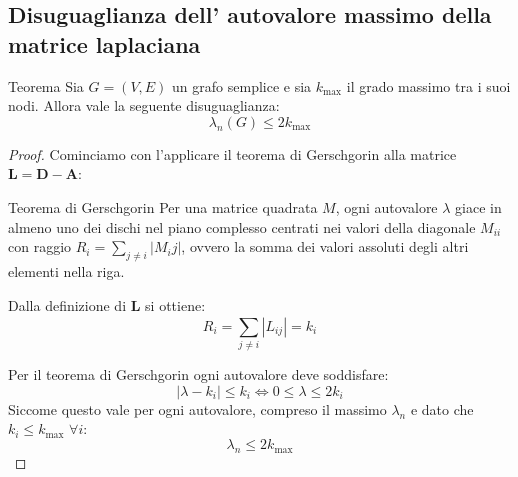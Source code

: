 \subsection{Disuguaglianza dell' autovalore massimo della matrice laplaciana}
\begin{boxl}{Teorema}
  Sia $G=(V,E)$ un grafo semplice e sia $k_{\text{max}}$ il grado massimo tra i suoi nodi. Allora vale la seguente disuguaglianza:
  \begin{equation}
    \lambda_n(G) \le 2 k_{\text{max}}
  \end{equation}
\end{boxl}
\begin{proof}
Cominciamo con l'applicare il teorema di Gerschgorin alla matrice $\mathbf{L}=\mathbf{D}-\mathbf{A}$:

    \begin{boxl}{Teorema di Gerschgorin}
    Per una matrice quadrata $M$, ogni autovalore $\lambda$ giace in almeno uno dei dischi nel piano complesso centrati nei valori della diagonale $M_{ii}$ con raggio $R_i=\sum_{j \not = i}^{}\left\lvert M_ij\right\rvert $, ovvero la somma dei valori assoluti degli altri elementi nella riga.
    \end{boxl}

Dalla definizione di $\mathbf{L}$ si ottiene:
\begin{equation}
    R_i=\sum_{j \not = i}^{}\left\lvert L_{ij}\right\rvert = k_i
\end{equation}

Per il teorema di Gerschgorin ogni autovalore deve soddisfare:
\begin{equation}
    \left\lvert \lambda -k_i\right\rvert \le k_i \Leftrightarrow  0 \le \lambda \le 2k_i
\end{equation}
Siccome questo vale per ogni autovalore, compreso il massimo $\lambda_n$ e dato che $k_i \le k_{\text{max}}$ $ \forall i$:
\begin{equation}
    \lambda_n \le 2 k_{\text{max}}
\end{equation}
\end{proof}
